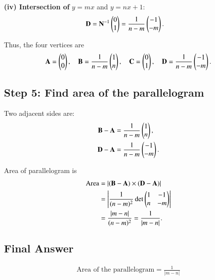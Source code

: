 \documentclass[journal]{IEEEtran}
\begin{document}
\noindent
\textbf{(iv) Intersection of } \(y=mx\) and \(y=nx+1\):
\begin{align}
\mathbf{D} &= \mathbf{N}^{-1}\begin{pmatrix}0 \\ 1\end{pmatrix}
= \frac{1}{n - m}\begin{pmatrix}-1 \\ -m\end{pmatrix}.
\end{align}

Thus, the four vertices are
\begin{align}
\mathbf{A} = \begin{pmatrix}0 \\ 0\end{pmatrix}, \quad
\mathbf{B} = \frac{1}{n - m}\begin{pmatrix}1 \\ n\end{pmatrix}, \quad
\mathbf{C} = \begin{pmatrix}0 \\ 1\end{pmatrix}, \quad
\mathbf{D} = \frac{1}{n - m}\begin{pmatrix}-1 \\ -m\end{pmatrix}.
\end{align}

\subsection*{Step 5: Find area of the parallelogram}

Two adjacent sides are:
\begin{align}
\mathbf{B}-\mathbf{A} &= \frac{1}{n - m}\begin{pmatrix}1 \\ n\end{pmatrix},\\
\mathbf{D}-\mathbf{A} &= \frac{1}{n - m}\begin{pmatrix}-1 \\ -m\end{pmatrix}.
\end{align}

Area of parallelogram is
\begin{align}
\text{Area} &= \left\vert(\mathbf{B}-\mathbf{A}) \times (\mathbf{D}-\mathbf{A})\right\vert \\
&= \left| \frac{1}{(n-m)^2} 
\det\begin{pmatrix}1 & -1 \\ n & -m\end{pmatrix} \right| \\
&= \frac{|m - n|}{(n - m)^2} = \frac{1}{|m - n|}.
\end{align}

\subsection*{Final Answer}
\begin{align}
\boxed{\text{Area of the parallelogram} = \frac{1}{|m - n|}}
\end{align}
\end{document}

